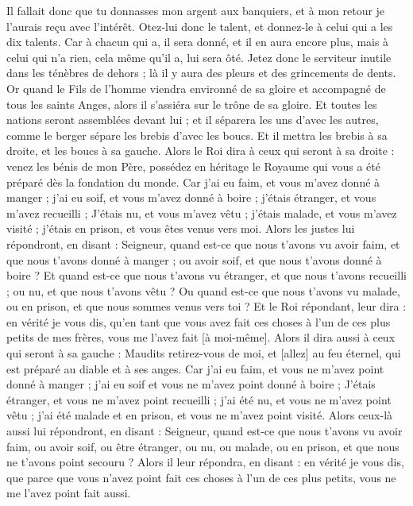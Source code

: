 \begin{multicols}{2}
Il fallait donc que tu donnasses mon argent aux banquiers, et à mon retour je l'aurais reçu avec l'intérêt.
Otez-lui donc le talent, et donnez-le à celui qui a les dix talents.
Car à chacun qui a, il sera donné, et il en aura encore plus, mais à celui qui n'a rien, cela même qu'il a, lui sera ôté.
Jetez donc le serviteur inutile dans les ténèbres de dehors ; là il y aura des pleurs et des grincements de dents.
Or quand le Fils de l'homme viendra environné de sa gloire et accompagné de tous les saints Anges, alors il s'assiéra sur le trône de sa gloire.
Et toutes les nations seront assemblées devant lui ; et il séparera les uns d'avec les autres, comme le berger sépare les brebis d'avec les boucs.
Et il mettra les brebis à sa droite, et les boucs à sa gauche.
Alors le Roi dira à ceux qui seront à sa droite : venez les bénis de mon Père, possédez en héritage le Royaume qui vous a été préparé dès la fondation du monde.
Car j'ai eu faim, et vous m'avez donné à manger ; j'ai eu soif, et vous m'avez donné à boire ; j'étais étranger, et vous m'avez recueilli ;
J'étais nu, et vous m'avez vêtu ; j'étais malade, et vous m'avez visité ; j'étais en prison, et vous êtes venus vers moi.
Alors les justes lui répondront, en disant : Seigneur, quand est-ce que nous t'avons vu avoir faim, et que nous t'avons donné à manger ; ou avoir soif, et que nous t'avons donné à boire ?
Et quand est-ce que nous t'avons vu étranger, et que nous t'avons recueilli ; ou nu, et que nous t'avons vêtu ?
Ou quand est-ce que nous t'avons vu malade, ou en prison, et que nous sommes venus vers toi ?
Et le Roi répondant, leur dira : en vérité je vous dis, qu'en tant que vous avez fait ces choses à l'un de ces plus petits de mes frères, vous me l'avez fait [à moi-même].
Alors il dira aussi à ceux qui seront à sa gauche : Maudits retirez-vous de moi, et [allez] au feu éternel, qui est préparé au diable et à ses anges.
Car j'ai eu faim, et vous ne m'avez point donné à manger ; j'ai eu soif et vous ne m'avez point donné à boire ;
J'étais étranger, et vous ne m'avez point recueilli ; j'ai été nu, et vous ne m'avez point vêtu ; j'ai été malade et en prison, et vous ne m'avez point visité.
Alors ceux-là aussi lui répondront, en disant : Seigneur, quand est-ce que nous t'avons vu avoir faim, ou avoir soif, ou être étranger, ou nu, ou malade, ou en prison, et que nous ne t'avons point secouru ?
Alors il leur répondra, en disant : en vérité je vous dis, que parce que vous n'avez point fait ces choses à l'un de ces plus petits, vous ne me l'avez point fait aussi.

\end{multicols}
